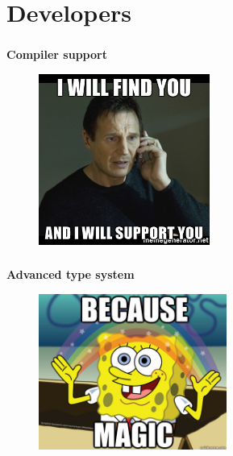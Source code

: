 \documentclass[usenames,dvipsnames, 18pt, compress, aspectratio=169]{beamer}
\begin{document}
\fontsize{13pt}{14}\selectfont
\section{Developers}
\fontsize{17pt}{18}\selectfont

\fontsize{17pt}{19}\selectfont
\begin{frame}
    \frametitle{}
    \begin{center}
    \textbf{Compiler support}

    \begin{figure}
        \includegraphics[width=0.5\textwidth,center]{i-will-find-you-and-i-will-support-you.jpg}
    \end{figure}

    \end{center}
\end{frame}

\begin{frame}
    \frametitle{}
    \begin{center}
    \textbf{Advanced type system}

    \begin{figure}
        \includegraphics[width=0.55\textwidth,center]{magic.jpg}
    \end{figure}

    \end{center}
\end{frame}
\end{document}
